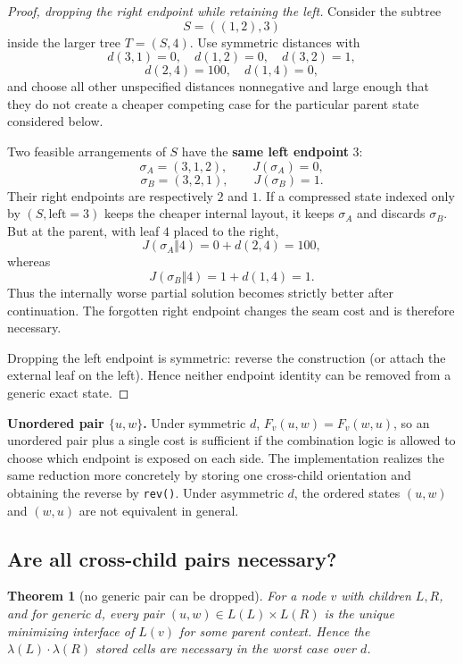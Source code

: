 \documentclass[11pt]{article}
\theoremstyle{plain}
\newtheorem{theorem}{Theorem}[section]
\begin{document}
\begin{proof}[Proof, dropping the right endpoint while retaining the left]
Consider the subtree
\[
S=((1,2),3)
\]
inside the larger tree \(T=(S,4)\). Use symmetric distances with
\[
d(3,1)=0,\quad d(1,2)=0,\quad d(3,2)=1,
\]
\[
d(2,4)=100,\quad d(1,4)=0,
\]
and choose all other unspecified distances nonnegative and large enough that
they do not create a cheaper competing case for the particular parent state
considered below.

Two feasible arrangements of \(S\) have the \textbf{same left endpoint} \(3\):
\[
\sigma_A=(3,1,2), \qquad J(\sigma_A)=0,
\]
\[
\sigma_B=(3,2,1), \qquad J(\sigma_B)=1.
\]
Their right endpoints are respectively \(2\) and \(1\). If a compressed state
indexed only by \((S,\text{left}=3)\) keeps the cheaper internal layout, it
keeps \(\sigma_A\) and discards \(\sigma_B\). But at the parent, with leaf
\(4\) placed to the right,
\[
J(\sigma_A\Vert 4)=0+d(2,4)=100,
\]
whereas
\[
J(\sigma_B\Vert 4)=1+d(1,4)=1.
\]
Thus the internally worse partial solution becomes strictly better after
continuation. The forgotten right endpoint changes the seam cost and is
therefore necessary.

Dropping the left endpoint is symmetric: reverse the construction (or attach
the external leaf on the left). Hence neither endpoint identity can be removed
from a generic exact state.
\end{proof}

\textbf{Unordered pair \(\{u,w\}\).} Under symmetric \(d\),
\(F_v(u,w)=F_v(w,u)\), so an unordered pair plus a single cost is sufficient if
the combination logic is allowed to choose which endpoint is exposed on each
side. The implementation realizes the same reduction more concretely by storing
one cross-child orientation and obtaining the reverse by \texttt{rev()}. Under
asymmetric \(d\), the ordered states \((u,w)\) and \((w,u)\) are not equivalent
in general.

\subsection{Are all cross-child pairs necessary?}

\begin{theorem}[no generic pair can be dropped]\label{thm:nodrop}
For a node \(v\) with children \(L,R\), and for generic \(d\), every pair
\((u,w) \in L(L)\times L(R)\) is the unique minimizing interface of \(L(v)\)
for some parent context. Hence the \(\lambda(L)\cdot\lambda(R)\) stored cells
are necessary in the worst case over \(d\).
\end{theorem}
\end{document}
